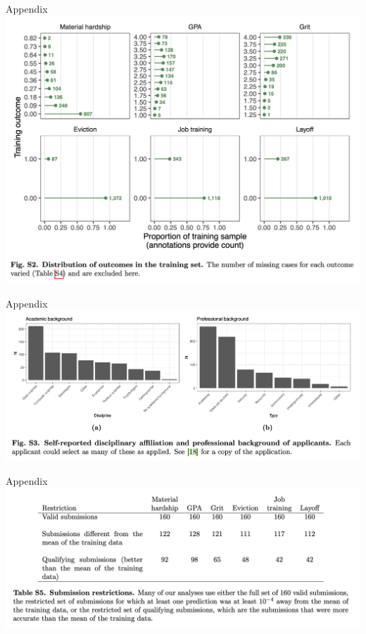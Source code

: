 \documentclass{beamer}
\begin{document}
\begin{frame}{Appendix}
\includegraphics[width = \textwidth]{figures/si_outcome_histograms}
\end{frame}

\begin{frame}{Appendix}
\includegraphics[width = \textwidth]{figures/si_disciplines}
\end{frame}

\begin{frame}{Appendix}
\includegraphics[width = \textwidth]{figures/si_qualifying_table}
\end{frame}
\end{document}
